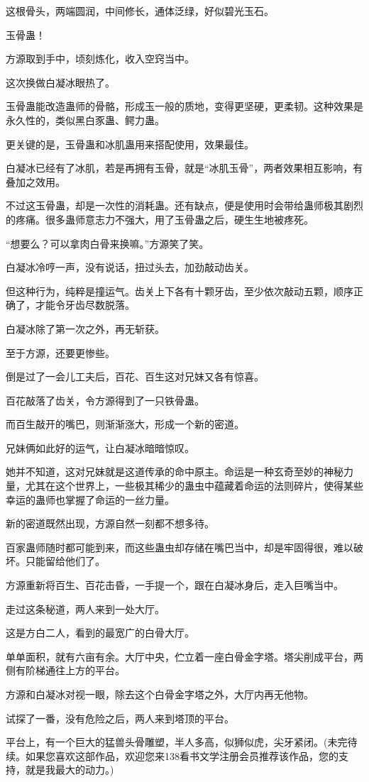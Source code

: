 \begin{this_body}
这根骨头，两端圆润，中间修长，通体泛绿，好似碧光玉石。

玉骨蛊！

方源取到手中，顷刻炼化，收入空窍当中。

这次换做白凝冰眼热了。

玉骨蛊能改造蛊师的骨骼，形成玉一般的质地，变得更坚硬，更柔韧。这种效果是永久性的，类似黑白豕蛊、鳄力蛊。

更关键的是，玉骨蛊和冰肌蛊用来搭配使用，效果最佳。

白凝冰已经有了冰肌，若是再拥有玉骨，就是“冰肌玉骨”，两者效果相互影响，有叠加之效用。

不过这玉骨蛊，却是一次性的消耗蛊。还有缺点，便是使用时会带给蛊师极其剧烈的疼痛。很多蛊师意志力不强大，用了玉骨蛊之后，硬生生地被疼死。

“想要么？可以拿肉白骨来换嘛。”方源笑了笑。

白凝冰冷哼一声，没有说话，扭过头去，加劲敲动齿关。

但这种行为，纯粹是撞运气。齿关上下各有十颗牙齿，至少依次敲动五颗，顺序正确了，才能令牙齿尽数脱落。

白凝冰除了第一次之外，再无斩获。

至于方源，还要更惨些。

倒是过了一会儿工夫后，百花、百生这对兄妹又各有惊喜。

百花敲落了齿关，令方源得到了一只铁骨蛊。

而百生敲开的嘴巴，则渐渐涨大，形成一个新的密道。

兄妹俩如此好的运气，让白凝冰暗暗惊叹。

她并不知道，这对兄妹就是这道传承的命中原主。命运是一种玄奇至妙的神秘力量，尤其在这个世界上，一些极其稀少的蛊虫中蕴藏着命运的法则碎片，使得某些幸运的蛊师也掌握了命运的一丝力量。

新的密道既然出现，方源自然一刻都不想多待。

百家蛊师随时都可能到来，而这些蛊虫却存储在嘴巴当中，却是牢固得很，难以破坏。只能留给他们了。

方源重新将百生、百花击昏，一手提一个，跟在白凝冰身后，走入巨嘴当中。

走过这条秘道，两人来到一处大厅。

这是方白二人，看到的最宽广的白骨大厅。

单单面积，就有六亩有余。大厅中央，伫立着一座白骨金字塔。塔尖削成平台，两侧有阶梯通往上方的平台。

方源和白凝冰对视一眼，除去这个白骨金字塔之外，大厅内再无他物。

试探了一番，没有危险之后，两人来到塔顶的平台。

平台上，有一个巨大的猛兽头骨雕塑，半人多高，似狮似虎，尖牙紧闭。(未完待续。如果您喜欢这部作品，欢迎您来138看书文学注册会员推荐该作品，您的支持，就是我最大的动力。)

\end{this_body}

